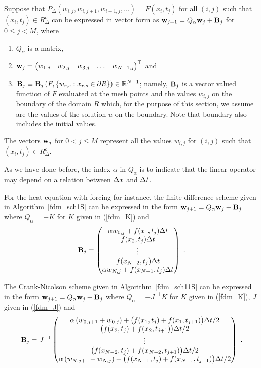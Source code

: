 Suppose that
$P_\Delta(w_{i,j},w_{i,j+1},w_{i+1,j}, \ldots) = F(x_i,t_j)$ for all
$(i,j)$ such that $(x_i,t_j) \in R^o_\Delta$ can be expressed
in vector form as $\mathbf{w}_{j+1} = Q_\alpha\mathbf{w}_j + \mathbf{B}_j$
for $0 \leq j < M$, where
\begin{enumerate}
\item $Q_\alpha$ is a  matrix,
\item $\displaystyle \mathbf{w}_j = \begin{pmatrix}
w_{1,j} & w_{2,j} & w_{3,j} & \ldots & w_{N-1,j} \end{pmatrix}^\top$
and
\item $\mathbf{B}_j
\equiv \mathbf{B}_j\left(F,\{w_{r,s}:x_{r,s} \in \partial R\}\right) \in \mathbb{R}^{N-1}$;
namely, $\mathbf{B}_j$ is a vector valued function of $F$ evaluated at
the mesh points and the values $w_{i,j}$ on the boundary
of the domain $R$ which, for the purpose of this section, we assume
are the values of the solution $u$ on the boundary.  Note that
boundary also includes the initial values.
\end{enumerate}
The vectors $\mathbf{w}_j$ for $0<j\leq M$ represent all
the values $w_{i,j}$ for $(i,j)$ such that $(x_i,t_j) \in R^o_\Delta$.

As we have done before, the index $\alpha$ in $Q_\alpha$ is to indicate
that the linear operator may depend on a relation between $\Delta{x}$
and $\Delta{t}$.

\begin{egg}
For the heat equation with forcing for instance,
the finite difference scheme given in Algorithm~\ref{fdm_sch1S} can be
expressed in the form $\mathbf{w}_{j+1} = Q_\alpha\mathbf{w}_j + \mathbf{B}_j$ where
$Q_\alpha = -K$ for $K$ given in (\ref{fdm_K}) and
\[
\mathbf{B}_j = \begin{pmatrix}
\alpha w_{0,j} + f(x_1,t_j) \Delta{t} \\
f(x_2,t_j) \Delta{t} \\
\vdots \\
f(x_{N-2},t_j) \Delta{t} \\
\alpha w_{N,j} + f(x_{N-1},t_j) \Delta{t}
\end{pmatrix} \ .
\]

The Crank-Nicolson scheme given in Algorithm~\ref{fdm_sch11S} can
be expressed in the form $\mathbf{w}_{j+1} = Q_\alpha\mathbf{w}_j + \mathbf{B}_j$ where
$Q_\alpha = -J^{-1}K$ for $K$ given in (\ref{fdm_K}), $J$ given in
(\ref{fdm_J}) and
\[
\mathbf{B}_j = J^{-1} \begin{pmatrix}
\alpha \left( w_{0,j+1} + w_{0,j} \right)
+ \big( f(x_1,t_j) + f(x_1,t_{j+1}) \big)\Delta{t}/2 \\
\big( f(x_2,t_j) + f(x_2,t_{j+1}) \big)\Delta{t}/2 \\
\vdots \\
\big( f(x_{N-2},t_j) + f(x_{N-2},t_{j+1}) \big)\Delta{t}/2 \\
\alpha \left( w_{N,j+1} + w_{N,j} \right)
+ \big( f(x_{N-1},t_j)  + f(x_{N-1},t_{j+1}) \big)\Delta{t}/2
\end{pmatrix} \ .
\]
\label{Moreell2StabEgg}
\end{egg}

